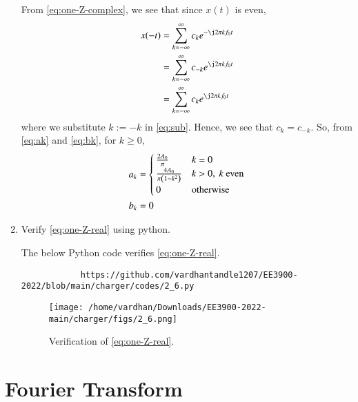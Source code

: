 \documentclass[journal,12pt,twocolumn]{IEEEtran}
\renewcommand\thesection{\arabic{section}}
\begin{document}
\begin{enumerate}[label=\thesection.\arabic*,ref=\thesection.\theenumi]
		\solution From \eqref{eq:one-Z-complex}, we see that since $x(t)$ is even,
		\begin{align}
			x(-t) &= \sum_{k = -\infty}^{\infty}c_ke^{-\j2\pi kf_0 t} \\
			&= \sum_{k = -\infty}^{\infty}c_{-k}e^{\j2\pi kf_0t} \label{eq:sub} \\
			&= \sum_{k = -\infty}^{\infty}c_ke^{\j2\pi kf_0 t}
		\end{align}
		where we substitute $k := -k$ in \eqref{eq:sub}. Hence, we see that 
		$c_k = c_{-k}$. So, from \eqref{eq:ak} and \eqref{eq:bk}, for $k \ge 0$,
		\begin{align}
			a_k &= 
			\begin{cases}
				\frac{2A_0}{\pi} & k = 0 \\
				\frac{4A_0}{\pi\brak{1 - k^2}} & k > 0,\ k\ \text{even} \\
				0 & \text{otherwise}
			\end{cases} \label{eq:ak-xt}\\
			b_k &= 0
			\label{eq:bk-xt}
		\end{align}
		\item Verify 
		\eqref{eq:one-Z-real}
		using python.
		
		\solution The below Python code verifies \eqref{eq:one-Z-real}.
		\begin{lstlisting}
			https://github.com/vardhantandle1207/EE3900-2022/blob/main/charger/codes/2_6.py
		\end{lstlisting}
		\begin{figure}[!ht]
			\texttt{[image: /home/vardhan/Downloads/EE3900-2022-main/charger/figs/2\_6.png]}
			\caption{Verification of \eqref{eq:one-Z-real}.}
			\label{fig:ver-real}
		\end{figure}
	\end{enumerate}
	\section{Fourier Transform}
	
\end{document}

